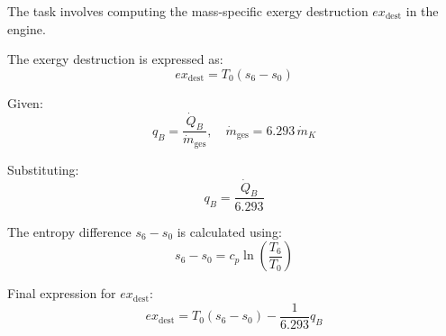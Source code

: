 The task involves computing the mass-specific exergy destruction \( ex_{\text{dest}} \) in the engine.  

The exergy destruction is expressed as:  
\[
ex_{\text{dest}} = T_0 (s_6 - s_0)
\]  

Given:  
\[
q_B = \frac{\dot{Q}_B}{\dot{m}_{\text{ges}}}, \quad \dot{m}_{\text{ges}} = 6.293 \, \dot{m}_K
\]  

Substituting:  
\[
q_B = \frac{\dot{Q}_B}{6.293}
\]  

The entropy difference \( s_6 - s_0 \) is calculated using:  
\[
s_6 - s_0 = c_p \ln \left( \frac{T_6}{T_0} \right)
\]  

Final expression for \( ex_{\text{dest}} \):  
\[
ex_{\text{dest}} = T_0 (s_6 - s_0) - \frac{1}{6.293} q_B
\]